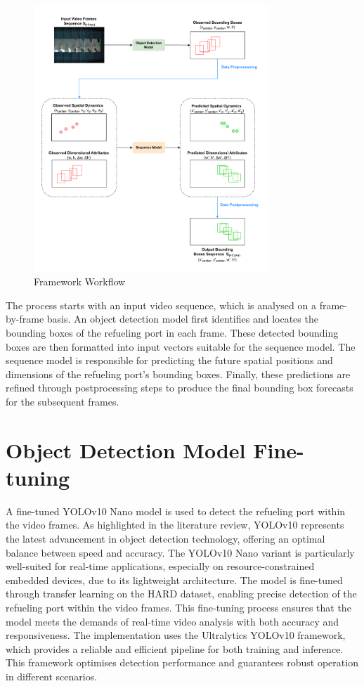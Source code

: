 \documentclass[12pt,oneside]{book} %
\begin{document}
\begin{figure}[H]
    \centering
    \includegraphics[width=0.79\textwidth]{figures/FrameworkWorkflow.drawio.pdf}
    \caption{Framework Workflow}\label{fig:framework-workflow}
\end{figure}

The process starts with an input video sequence, which is analysed on a
frame-by-frame basis. An object detection model first identifies and locates
the bounding boxes of the refueling port in each frame. These detected bounding
boxes are then formatted into input vectors suitable for the sequence model.
The sequence model is responsible for predicting the future spatial positions
and dimensions of the refueling port’s bounding boxes. Finally, these
predictions are refined through postprocessing steps to produce the final
bounding box forecasts for the subsequent frames.

\section{Object Detection Model Fine-tuning}
A fine-tuned YOLOv10 Nano model is used to detect the refueling port within the
video frames. As highlighted in the literature review, YOLOv10 represents the
latest advancement in object detection technology, offering an optimal balance
between speed and accuracy. The YOLOv10 Nano variant is particularly
well-suited for real-time applications, especially on resource-constrained
embedded devices, due to its lightweight architecture. The model is fine-tuned
through transfer learning on the HARD dataset, enabling precise detection of
the refueling port within the video frames. This fine-tuning process ensures
that the model meets the demands of real-time video analysis with both accuracy
and responsiveness. The implementation uses the Ultralytics YOLOv10 framework,
which provides a reliable and efficient pipeline for both training and
inference. This framework optimises detection performance and guarantees robust
operation in different scenarios.
\end{document}
